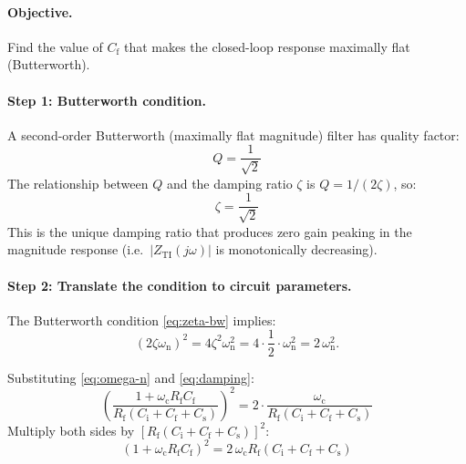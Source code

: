 \documentclass[a4paper,11pt]{article}
\begin{document}
\paragraph{Objective.}
Find the value of $C_{\mathrm{f}}$ that makes the closed-loop response
maximally flat (Butterworth).

\paragraph{Step 1: Butterworth condition.}

A second-order Butterworth (maximally flat magnitude) filter has
quality factor:
\begin{equation*}
  Q = \frac{1}{\sqrt{2}}
\end{equation*}
The relationship between $Q$ and the damping ratio $\zeta$ is
$Q = 1/(2\zeta)$, so:
\begin{equation}
  \zeta = \frac{1}{\sqrt{2}}
  \label{eq:zeta-bw}
\end{equation}
This is the unique damping ratio that produces zero gain peaking in the
magnitude response (i.e.\ $|Z_{\mathrm{TI}}(j\omega)|$ is
monotonically decreasing).

\paragraph{Step 2: Translate the condition to circuit parameters.}

The Butterworth condition \eqref{eq:zeta-bw} implies:
\begin{equation*}
  (2\zeta\omega_{\mathrm{n}})^2
  = 4\zeta^2\omega_{\mathrm{n}}^2
  = 4 \cdot \frac{1}{2} \cdot \omega_{\mathrm{n}}^2
  = 2\,\omega_{\mathrm{n}}^2.
\end{equation*}

Substituting \eqref{eq:omega-n} and \eqref{eq:damping}:
\begin{equation*}
  \left(
    \frac{1 + \omega_{\mathrm{c}} R_{\mathrm{f}} C_{\mathrm{f}}}
         {R_{\mathrm{f}}(C_{\mathrm{i}} + C_{\mathrm{f}}
          + C_{\mathrm{s}})}
  \right)^{\!2}
  = 2 \cdot \frac{\omega_{\mathrm{c}}}
                  {R_{\mathrm{f}}(C_{\mathrm{i}} + C_{\mathrm{f}}
                   + C_{\mathrm{s}})}
\end{equation*}
Multiply both sides by
$[R_{\mathrm{f}}(C_{\mathrm{i}} + C_{\mathrm{f}} + C_{\mathrm{s}})]^2$:
\begin{equation}
  (1 + \omega_{\mathrm{c}} R_{\mathrm{f}} C_{\mathrm{f}})^2
  = 2\,\omega_{\mathrm{c}} R_{\mathrm{f}}
    (C_{\mathrm{i}} + C_{\mathrm{f}} + C_{\mathrm{s}})
  \label{eq:bw-condition}
\end{equation}
\end{document}
